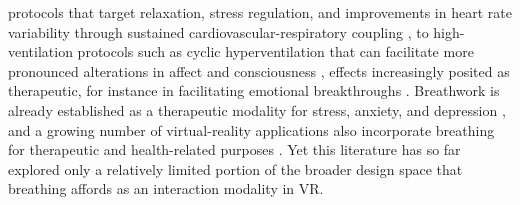 protocols that target relaxation, stress regulation, and improvements in heart
rate variability through sustained cardiovascular-respiratory coupling
\citep{Balban2023, Ahmed2021, Siebieszuk2025}, to high-ventilation protocols
such as cyclic hyperventilation that can facilitate more pronounced alterations
in affect and consciousness \citep{bahi2024effects, lewis2024breathwork,
havenith2025decreased}, effects increasingly posited as therapeutic, for
instance in facilitating emotional breakthroughs \citep{fincham2026airways,
fincham2024effects}. Breathwork is already established as a therapeutic
modality for stress, anxiety, and depression \citep{fincham2023effect,
hopper2023breathing, tymko2023breathwork}, and a growing number of virtual-reality applications also incorporate breathing for therapeutic and health-related purposes \citep{CortezVazquez2024, Pancini2025}. Yet this literature has so far explored only a relatively limited portion of the broader design space that breathing affords as an interaction modality in VR.

